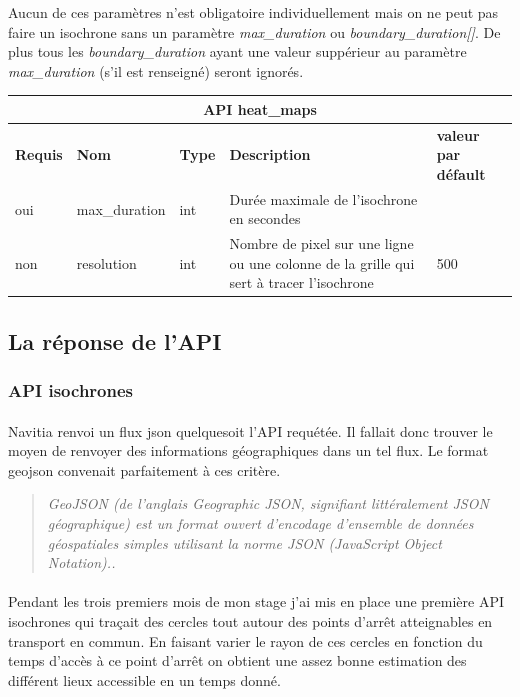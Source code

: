 \documentclass[a4paper]{report}
\begin{document}
Aucun de ces paramètres n'est obligatoire individuellement mais on ne peut pas faire un isochrone sans un paramètre \emph{max\_duration} ou \emph{boundary\_duration[]}. De plus tous les \emph{boundary\_duration} ayant une valeur suppérieur au paramètre \emph{max\_duration} (s'il est renseigné) seront ignorés. 

\begin{center}
	\begin{tabular}{|l|l|p{1.5cm}|p{6cm}|l|}
	\hline
	\multicolumn{5}{|c|}{\cellcolor{LightCyan} \textbf{API heat\_maps}} \\
	\hline
	\textbf{Requis} & \textbf{Nom} & \textbf{Type} & \textbf{Description} &  \textbf{valeur par défault} \\
	\hline
	oui & max\_duration & int & Durée maximale de l'isochrone en secondes &\\
	\hline
	non & resolution & int & Nombre de pixel sur une ligne ou une colonne de la grille qui sert à tracer l'isochrone & 500\\
	\hline
	\end{tabular}
\end{center}

\subsection{La réponse de l'API}

\subsubsection{API isochrones} 

\paragraph{}Navitia renvoi un flux json quelquesoit l'API requétée. Il fallait donc trouver le moyen de renvoyer des informations géographiques dans un tel flux. Le format geojson convenait parfaitement à ces critère.

\begin{quote}
	\emph{GeoJSON (de l'anglais Geographic JSON, signifiant littéralement JSON géographique) est un format ouvert d'encodage d'ensemble de données géospatiales simples utilisant la 		norme JSON (JavaScript Object Notation).\cite{ref}.}
\end{quote}


\paragraph{} Pendant les trois premiers mois de mon stage j'ai mis en place une première API isochrones qui traçait des cercles tout autour des points d'arrêt atteignables en transport en commun. En faisant varier le rayon de ces cercles en fonction du temps d'accès à ce point d'arrêt on obtient une assez bonne estimation des différent lieux accessible en un temps donné.
\end{document}
